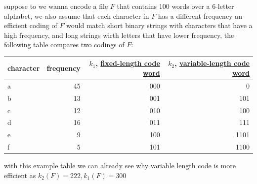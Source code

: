 \documentclass[a4paper,12pt]{article}
\begin{document}
\begin{my_example}
suppose to we wanna encode a file \(F\) that contains 100 words over a 6-letter alphabet, we also assume that each character in \(F\) has a different frequency
an efficient coding of \(F\) would match short binary strings with characters that have a high frequency, and long strings wirth letters that have lower frequency, the following table compares two codings of \(F\):
\begin{center}
\begin{tabular}{lrrr}
character & frequency & \(k_1\), \href{20230119170007-fixed_length_code_word.org}{fixed-length code word} & \(k_2\), \href{20230119170058-variable_length_code_word.org}{variable-length code word}\\[0pt]
\hline
a & 45 & 000 & 0\\[0pt]
b & 13 & 001 & 101\\[0pt]
c & 12 & 010 & 100\\[0pt]
d & 16 & 011 & 111\\[0pt]
e & 9 & 100 & 1101\\[0pt]
f & 5 & 101 & 1100\\[0pt]
\end{tabular}
\end{center}
with this example table we can already see why variable length code is more efficient as \(k_2(F)=222,k_1(F)=300\)
\end{my_example}
\end{document}
